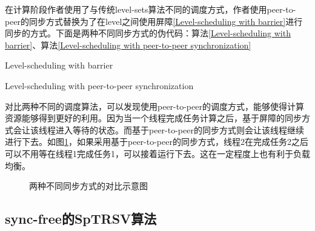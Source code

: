 在计算阶段作者使用了与传统level-sets算法不同的调度方式，作者使用peer-to-peer的同步方式替换为了在level之间使用屏障\ref{Level-scheduling with barrier}进行同步的方式。下面是两种不同同步方式的伪代码：算法\ref{Level-scheduling with barrier}、算法\ref{Level-scheduling with peer-to-peer synchronization}

\begin{algorithm}
    \caption{Level-scheduling with barrier}
    \label{Level-scheduling with barrier}
\end{algorithm}
\begin{algorithm}
    \caption{Level-scheduling with peer-to-peer synchronization}
    \label{Level-scheduling with peer-to-peer synchronization}
\end{algorithm}

对比两种不同的调度算法，可以发现使用peer-to-peer的调度方式，能够使得计算资源能够得到更好的利用。因为当一个线程完成任务计算之后，基于屏障的同步方式会让该线程进入等待的状态。而基于peer-to-peer的同步方式则会让该线程继续进行下去。如图\ref{两种不同同步方式的对比示意图}，如果采用基于peer-to-peer的同步方式，线程2在完成任务2之后可以不用等在线程1完成任务1，可以接着运行下去。这在一定程度上也有利于负载均衡。

\begin{figure}[htbp]
    \caption{两种不同同步方式的对比示意图}
    \label{两种不同同步方式的对比示意图}
    \centering
    \centering
\end{figure}

\subsection{sync-free的SpTRSV算法}

